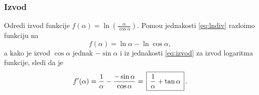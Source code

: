 \subsubsection{Izvod}

\zadatak Odredi izvod funkcije $\displaystyle{f(\alpha)=\ln\left(\frac\alpha{\cos\alpha}\right)}$.
\resenje Pomo{\cc}u jednakosti \eqref{eq:lndiv} razlo{\zv}imo funkciju na 
$$f(\alpha)=\ln\alpha-\ln\cos\alpha,$$ 
a kako je izvod $\cos\alpha$ jednak $-\sin\alpha$ i iz jednakosti 
\eqref{eq:izvod} za izvod logaritma funkcije, sledi da je
$$
f'(\alpha)
=\frac1\alpha-\frac{-\sin\alpha}{\cos\alpha}
=\ram{\frac1\alpha+\tan\alpha}.
$$
